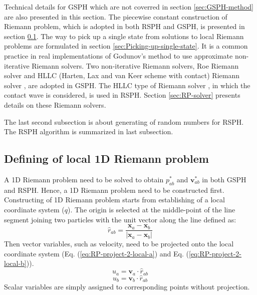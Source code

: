 Technical details for GSPH which are not coverred in section \ref{sec:GSPH-method} are also presented in this section.
The piecewise constant construction of Riemann problem, which is adopted in both RSPH and GSPH, is presented in section \ref{sec:RP-construction}. The way to pick up a single state from solutions to local Riemann problems are formulated in section \ref{sec:Picking-up-single-state}. It is a common practice in real implementations of Godunov's method to use approximate non-iterative Riemann solvers.
Two non-iterative Riemann solvers, Roe Riemann solver and HLLC (Harten, Lax and van Keer scheme with contact) Riemann solver \citep{toro1994restoration}, are adopted in GSPH. The HLLC type of Riemann solver \citep{toro1994restoration}, in which the contact wave is considered, is used in RSPH. Section \ref{sec:RP-solver} presents details on these Riemann solvers. 

The last second subsection is about generating of random numbers for RSPH. The RSPH algorithm is summarized in last subsection.

\subsection{Defining of local 1D Riemann problem} \label{sec:RP-construction}
A 1D Riemann problem need to be solved to obtain  $p_{a b}^{\ast}$ and $\textbf{v}_{a b}^{\ast}$ in both GSPH and RSPH. Hence, a 1D Riemann problem need to be constructed first. Constructing of 1D Riemann problem starts from establishing of a local coordinate system ($q$). The origin is selected at the middle-point of the line segment joining two particles with the unit vector along the line defined as: 
\begin{equation}
\hat{r}_{a b}= \frac{\textbf{x}_{a} - \textbf{x}_{ b}}{|\textbf{x}_{a} - \textbf{x}_{ b}|}
\end{equation}
Then vector variables, such as velocity, need to be projected onto the local coordinate system (Eq. (\ref{eq:RP-project-2-local-a}) and Eq. (\ref{eq:RP-project-2-local-b})). 
\begin{equation}
u_{a}= \textbf{v}_{a} \cdot \hat{r}_{a b}
\label{eq:RP-project-2-local-a}
\end{equation}
\begin{equation}
u_{b}= \textbf{v}_{b} \cdot \hat{r}_{a b}
\label{eq:RP-project-2-local-b}
\end{equation}
Scalar variables are simply assigned to corresponding points without projection.

